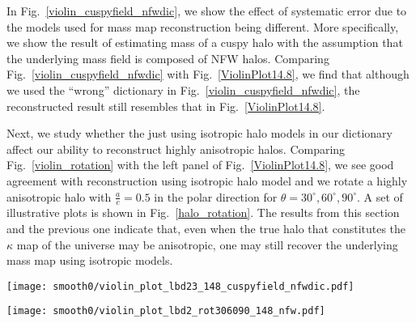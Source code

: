 \documentclass[twocolumn, usenames, dvipsnames]{aastex63}
\begin{document}
In Fig.~\ref{violin_cuspyfield_nfwdic}, we show the effect of systematic error
due to the models used for mass map reconstruction being different. More
specifically, we show the result of estimating mass of a cuspy halo with the
assumption that the underlying mass field is composed of NFW halos. Comparing
Fig.~\ref{violin_cuspyfield_nfwdic} with Fig.~\ref{ViolinPlot14.8}, we find
that although we used the ``wrong'' dictionary in
Fig.~\ref{violin_cuspyfield_nfwdic}, the reconstructed result still resembles
that in Fig.~\ref{ViolinPlot14.8}.

Next, we study whether the just using isotropic halo models in our dictionary
affect our ability to reconstruct highly anisotropic halos. Comparing
Fig.~\ref{violin_rotation} with the left panel of Fig.~\ref{ViolinPlot14.8}, we
see good agreement with reconstruction using isotropic halo model and we rotate
a highly anisotropic halo with $\frac{a}{c}=0.5$ in the polar direction for
$\theta = 30^\circ,60^\circ, 90^\circ$. A set of illustrative plots is shown in
Fig.~\ref{halo_rotation}. The results from this section and the previous one
indicate that, even when the true halo that constitutes the $\kappa$ map of the
universe may be anisotropic, one may still recover the underlying mass map
using isotropic models.

\begin{figure*}[!ht]
\centering
\texttt{[image: smooth0/violin\_plot\_lbd23\_148\_cuspyfield\_nfwdic.pdf]}
\caption{
    Detected halo number densities of cuspy NFW halo with mass
    $10^{14.8}~\textup{M}_\odot$ using NFW halo as dictionaries. The blue
    shaded area indicate the number density of detected mass that correspond to
    the indicated mass and redshift. The percentage above one probability
    distribution represents the percent of total correct estimation
    corresponding to the respective redshift. The true detection probabilities
    are 78\%, 69\%, and 62\% for each value of $\lambda$ respectively.
    }
    \label{violin_cuspyfield_nfwdic}
\end{figure*}

\begin{figure*}[!ht]
\centering
\texttt{[image: smooth0/violin\_plot\_lbd2\_rot306090\_148\_nfw.pdf]}
\caption{
    Detection number density plot of NFW halo with $\frac{a}{c}=0.5$ with mass
    $10^{14.8}~\textup{M}_\odot$, but with $\theta = 30^\circ, 60^\circ,
    90^\circ$. The shaded blue area indicate the number density of detected
    mass that correspond to the indicated mass and redshift. The percentage
    above one probability distribution represents the percent of total correct
    estimation corresponding to the respective redshift. The detection
    probabilities are 74\%, 71\%, and 77\% for each value of $\lambda$
    respectively.
    }
    \label{violin_rotation}
\end{figure*}
\end{document}
